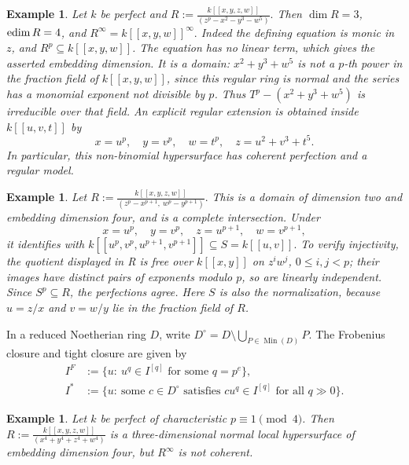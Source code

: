 \documentclass[11pt,a4paper]{amsart}
\numberwithin{equation}{section}
\newtheorem{example}[theorem]{Example}\newtheorem{notation}[theorem]{Notation}
\newcommand{\Min}{\operatorname{Min}}
\begin{document}
 

 
 \begin{example}\label{ex:three}	Let $k$ be perfect and
 $R:=\frac{k[[x,y,z,w]]}{(z^p-x^2-y^3-w^5)}.$	Then $\dim R=3$, $\operatorname{edim} R=4$, and
$	R^\infty=k[[x,y,w]]^\infty.$	Indeed the defining equation is monic in $z$, and	$R^p\subseteq k[[x,y,w]]$. 	The equation has no linear term, which gives the asserted embedding 	dimension. It is a domain: $x^2+y^3+w^5$ is not a $p$-th power 	in the fraction field of $k[[x,y,w]]$, since this regular ring is 	normal and the series has a monomial exponent not divisible by $p$. 	Thus $T^p-(x^2+y^3+w^5)$ is irreducible over that field. 	An explicit regular extension is obtained inside $k[[u,v,t]]$ by 	$$	x=u^p,\quad y=v^p,\quad w=t^p,\quad z=u^2+v^3+t^5.$$ 	In particular, this non-binomial hypersurface has coherent perfection	and a regular model.
 \end{example}
 
 \begin{example}
\label{ex:two}
 Let
 $R:=\frac{k[[x,y,z,w]]}	{(z^p-x^{p+1},\ w^p-y^{p+1})}.$	This is a domain of dimension two and embedding dimension four,	and is a complete intersection.	Under	$$x=u^p,\quad y=v^p,\quad z=u^{p+1},\quad w=v^{p+1},	$$	it identifies with	$	k[[u^p,v^p,u^{p+1},v^{p+1}]]\subseteq S=k[[u,v]].	$	To verify injectivity, the quotient displayed  in R is free over	$k[[x,y]]$ on $z^iw^j$, $0\leq i,j<p$; their images have	distinct pairs of exponents modulo $p$, so are linearly independent. 	Since $S^p\subseteq R$, the perfections agree. 	Here $S$ is also the normalization, because	$u=z/x$ and $v=w/y$ lie in the fraction field of $R$.
 \end{example}
 
In a reduced Noetherian ring $D$, write
$ D^\circ=D\setminus\bigcup_{P\in\Min(D)}P.$
The Frobenius closure and tight closure are given by
\begin{align*}	I^F&:=\{u:\ u^q\in I^{[q]}\text{ for some }q=p^e\},\\
	I^*&:=\{u:\ \text{some }c\in D^\circ\text{ satisfies }
	cu^q\in I^{[q]}\text{ for all }q\gg0\}.
\end{align*}

 
 \begin{example}\label{prop:quartic}	Let $k$ be perfect of characteristic $p\equiv1\pmod4$. Then
$R:=\frac{k[[x,y,z,w]]}{(x^4+y^4+z^4+w^4)}$	is a three-dimensional normal local hypersurface of embedding	dimension four, but $R^\infty$ is not coherent.
 \end{example}
 
\end{document}
